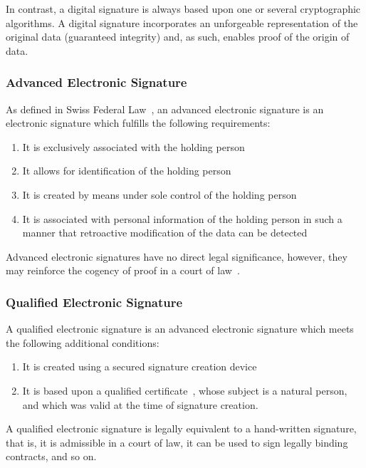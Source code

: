 In contrast, a digital signature is always based upon one or several cryptographic algorithms.
A digital signature incorporates an unforgeable representation of the original data (guaranteed integrity)
and, as such, enables proof of the origin of data.

\subsubsection{Advanced Electronic Signature}
As defined in Swiss Federal Law~\cite[Art. 2]{zertes},
an advanced electronic signature is an electronic signature which fulfills the following requirements:

\begin{enumerate}
    \item It is exclusively associated with the holding person
    \item It allows for identification of the holding person
    \item It is created by means under sole control of the holding person
    \item It is associated with personal information of the holding person in such a manner that retroactive modification of the data can be detected
\end{enumerate}

Advanced electronic signatures have no direct legal significance, however,
they may reinforce the cogency of proof in a court of law~\cite[4.19]{crypto-folien-hassenstein}.

\subsubsection{Qualified Electronic Signature}\label{subsubsec:qualifiedsignature}
A qualified electronic signature is an advanced electronic signature which meets the following additional conditions:
\begin{enumerate}
    \item It is created using a secured signature creation device~\cite[Art. 6]{zertes}
    \item It is based upon a qualified certificate~\cite[Art. 7 and 8]{zertes}, whose subject is a natural person,
    and which was valid at the time of signature creation.
\end{enumerate}

A qualified electronic signature is legally equivalent to a hand-written signature, that is,
it is admissible in a court of law, it can be used to sign legally binding contracts, and so on.


